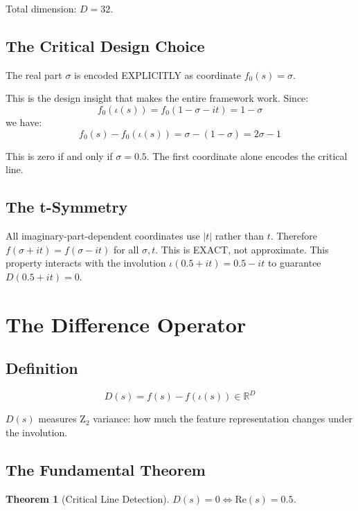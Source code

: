 \documentclass[11pt]{article}
\newtheorem{theorem}{Theorem}[section]
\begin{document}
Total dimension: $D = 32$.

\subsection{The Critical Design Choice}

The real part $\sigma$ is encoded EXPLICITLY as coordinate $f_0(s) = \sigma$.

This is the design insight that makes the entire framework work. Since:
$$f_0(\iota(s)) = f_0(1 - \sigma - it) = 1 - \sigma$$
we have:
$$f_0(s) - f_0(\iota(s)) = \sigma - (1 - \sigma) = 2\sigma - 1$$

This is zero if and only if $\sigma = 0.5$. The first coordinate alone encodes the critical line.

\subsection{The t-Symmetry}

All imaginary-part-dependent coordinates use $|t|$ rather than $t$. Therefore $f(\sigma + it) = f(\sigma - it)$ for all $\sigma, t$. This is EXACT, not approximate. This property interacts with the involution $\iota(0.5 + it) = 0.5 - it$ to guarantee $D(0.5 + it) = 0$.

\newpage
\section{The Difference Operator}
\label{sec:diff}

\subsection{Definition}

\begin{equation}
D(s) = f(s) - f(\iota(s)) \in \mathbb{R}^D
\end{equation}

$D(s)$ measures Z$_2$ variance: how much the feature representation changes under the involution.

\subsection{The Fundamental Theorem}

\begin{theorem}[Critical Line Detection]
$D(s) = 0 \iff \mathrm{Re}(s) = 0.5$.
\end{theorem}
\end{document}
